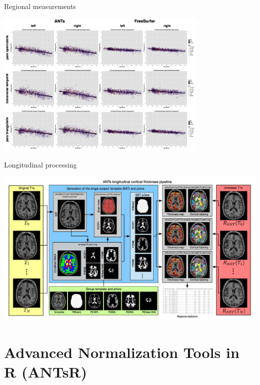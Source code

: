 \documentclass[ignorenonframetext,]{beamer}
\begin{document}
\begin{frame}{Regional measurements}

\begin{centering}

\includegraphics[width=4in]{./evaluation/figures/antsvfreesurfer_regionalPlots.png}

\end{centering}

\end{frame}

\begin{frame}{Longitudinal processing}

\includegraphics{./longitudinal/figures/longitudinalPipeline.png}

\end{frame}

\section{Advanced Normalization Tools in R
(ANTsR)}\label{advanced-normalization-tools-in-r-antsr}
\end{document}
